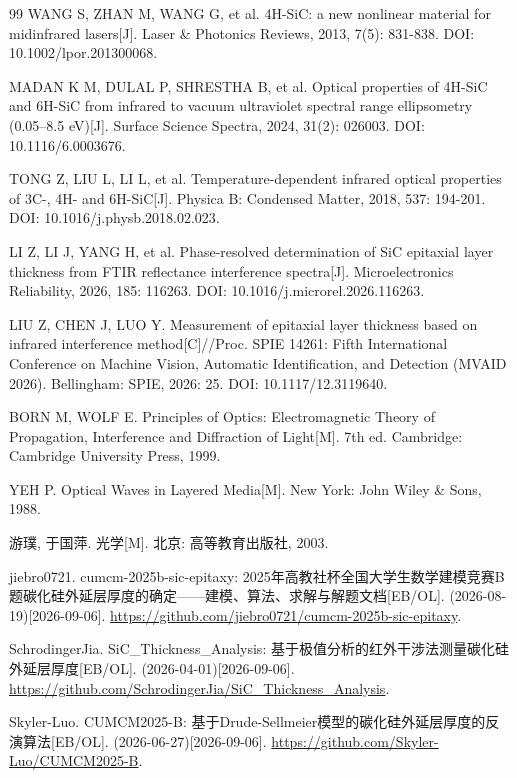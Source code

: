 \documentclass[11pt,a4paper,fontset=fandol]{ctexart}
\begin{document}
\begin{thebibliography}{99}
     WANG S, ZHAN M, WANG G, et al. 4H-SiC: a new nonlinear material for midinfrared lasers[J]. Laser \& Photonics Reviews, 2013, 7(5): 831-838. DOI: 10.1002/lpor.201300068.

     MADAN K M, DULAL P, SHRESTHA B, et al. Optical properties of 4H-SiC and 6H-SiC from infrared to vacuum ultraviolet spectral range ellipsometry (0.05--8.5 eV)[J]. Surface Science Spectra, 2024, 31(2): 026003. DOI: 10.1116/6.0003676.

     TONG Z, LIU L, LI L, et al. Temperature-dependent infrared optical properties of 3C-, 4H- and 6H-SiC[J]. Physica B: Condensed Matter, 2018, 537: 194-201. DOI: 10.1016/j.physb.2018.02.023.

     LI Z, LI J, YANG H, et al. Phase-resolved determination of SiC epitaxial layer thickness from FTIR reflectance interference spectra[J]. Microelectronics Reliability, 2026, 185: 116263. DOI: 10.1016/j.microrel.2026.116263.

     LIU Z, CHEN J, LUO Y. Measurement of epitaxial layer thickness based on infrared interference method[C]//Proc. SPIE 14261: Fifth International Conference on Machine Vision, Automatic Identification, and Detection (MVAID 2026). Bellingham: SPIE, 2026: 25. DOI: 10.1117/12.3119640.

     BORN M, WOLF E. Principles of Optics: Electromagnetic Theory of Propagation, Interference and Diffraction of Light[M]. 7th ed. Cambridge: Cambridge University Press, 1999.

     YEH P. Optical Waves in Layered Media[M]. New York: John Wiley \& Sons, 1988.

     游璞, 于国萍. 光学[M]. 北京: 高等教育出版社, 2003.

     jiebro0721. cumcm-2025b-sic-epitaxy: 2025年高教社杯全国大学生数学建模竞赛B题碳化硅外延层厚度的确定——建模、算法、求解与解题文档[EB/OL]. (2026-08-19)[2026-09-06]. \url{https://github.com/jiebro0721/cumcm-2025b-sic-epitaxy}.

     SchrodingerJia. SiC\_Thickness\_Analysis: 基于极值分析的红外干涉法测量碳化硅外延层厚度[EB/OL]. (2026-04-01)[2026-09-06]. \url{https://github.com/SchrodingerJia/SiC_Thickness_Analysis}.

     Skyler-Luo. CUMCM2025-B: 基于Drude-Sellmeier模型的碳化硅外延层厚度的反演算法[EB/OL]. (2026-06-27)[2026-09-06]. \url{https://github.com/Skyler-Luo/CUMCM2025-B}.


\end{thebibliography}
\end{document}
